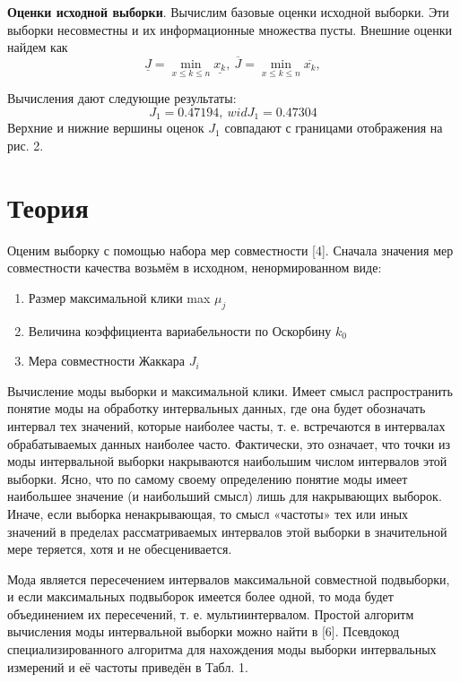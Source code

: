 \documentclass[a4paper,14pt]{article}
\begin{document}
	\textbf{Оценки исходной выборки}. Вычислим базовые оценки исходной выборки. Эти выборки несовместны и их информационные множества пусты. Внешние оценки найдем как
	\begin{equation}
		\underline{J} = \min_{x \leq k \leq n} \underline{x_k}, \ \overline{J} = \min_{x \leq k \leq n} \overline{x_k},
	\end{equation}
	
	Вычисления дают следующие результаты:
	\begin{equation}
		J_1 = 0.47194,\ wid J_1 = 0.47304
	\end{equation}
	Верхние и нижние вершины оценок $J_1$ совпадают с границами отображения на
	рис. 2.
	\newpage
	\section{Теория}
	Оценим выборку с помощью набора мер совместности [4].
	Сначала значения мер совместности качества возьмём в исходном, ненормированном виде:
	\begin{enumerate}
		\item Размер максимальной клики max $\mu_j$
		\item Величина коэффициента вариабельности по Оскорбину $k_0$
		\item Мера совместности Жаккара $J_i$
	\end{enumerate}
	
	Вычисление моды выборки и максимальной клики. Имеет смысл распространить понятие моды на обработку интервальных данных, где она будет обозначать интервал тех значений, которые наиболее часты, т. е. встречаются в интервалах обрабатываемых данных наиболее часто. Фактически, это означает, что точки из моды интервальной выборки накрываются наибольшим числом интервалов этой выборки. Ясно, что по самому своему определению понятие моды имеет наибольшее значение (и наибольший смысл) лишь для накрывающих выборок. Иначе, если выборка ненакрывающая, то смысл «частоты» тех или иных значений в пределах рассматриваемых интервалов этой выборки в значительной мере теряется, хотя и не обесценивается.
	
	Мода является пересечением интервалов максимальной совместной подвыборки, и если максимальных подвыборок имеется более одной, то мода будет объединением их пересечений, т. е. мультиинтервалом. Простой алгоритм вычисления моды интервальной выборки можно найти в [6]. Псевдокод специализированного алгоритма для нахождения моды выборки интервальных измерений и её частоты приведён в Табл. 1.
	
\end{document}
